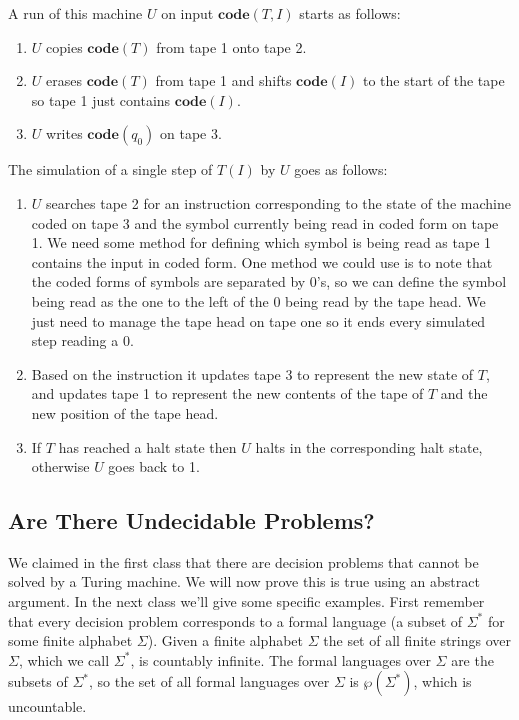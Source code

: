 \documentclass{article}
\theoremstyle{plain}
\theoremstyle{definition}
\newcommand{\co}{\mathbf{code}}
\begin{document}
A run of this machine $U$ on input $\co(T,I)$ starts as follows:
\begin{enumerate}
\item $U$ copies $\co(T)$ from tape 1 onto tape 2.
\item $U$ erases $\co(T)$ from tape 1 and shifts $\co(I)$ to the start of the tape so tape 1 just contains $\co(I)$.
\item $U$ writes $\co(q_0)$ on tape 3.
\end{enumerate}

The simulation of a single step of $T(I)$ by $U$ goes as follows:

\begin{enumerate}
\item $U$ searches tape 2 for an instruction corresponding to the state of the machine coded on tape 3 and the symbol currently being read in coded form on tape 1. We need some method for defining which symbol is being read as tape 1 contains the input in coded form. One method we could use is to note that the coded forms of symbols are separated by 0's, so we can define the symbol being read as the one to the left of the 0 being read by the tape head. We just need to manage the tape head on tape one so it ends every simulated step reading a 0.
\item Based on the instruction it updates tape 3 to represent the new state of $T$, and updates tape 1 to represent the new contents of the tape of $T$ and the new position of the tape head.
\item If $T$ has reached a halt state then $U$ halts in the corresponding halt state, otherwise $U$ goes back to 1.
\end{enumerate}


\subsection{Are There Undecidable Problems?}
We claimed in the first class that there are decision problems that cannot be solved by a Turing machine. We will now prove this is true using an abstract argument. In the next class we'll give some specific examples. First remember that every decision problem corresponds to a formal language (a subset of $\Sigma^*$ for some finite alphabet $\Sigma$). Given a finite alphabet $\Sigma$ the set of all finite strings over $\Sigma$, which we call $\Sigma^*$, is countably infinite. The formal languages over $\Sigma$ are the subsets of $\Sigma^*$, so the set of all formal languages over $\Sigma$ is $\wp(\Sigma^*)$, which is uncountable. 
\end{document}
